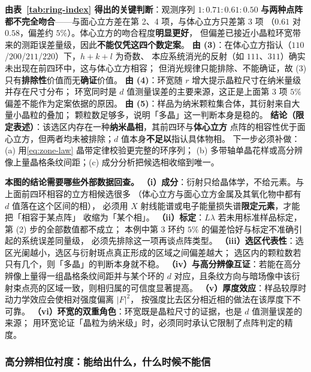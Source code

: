 \begin{infer}
\textbf{由表~\ref{tab:ring-index} 得出的关键判断}：观测序列 $1:0.71:0.61:0.50$
\textbf{与两种点阵都不完全吻合}——与面心立方差在第 2、4 项，与体心立方只差第 3 项
（$0.61$ 对 $0.58$，偏差约 $5\%$）。体心立方的吻合程度\textbf{明显更好}，
但偏差已接近小晶粒环宽带来的测距误差量级，因此\textbf{不能仅凭这四个数定案}。
\textbf{由 (3)}：在体心立方指认（$110$/$200$/$211$/$220$）下，$h+k+l$ 为奇数、
本应系统消光的反射（如 $111$、$311$）确实未出现在前四环中，这与体心立方相容；
但消光规律只能排除、不能确证，故 (3) 只有\textbf{排除性}价值而无\textbf{确证}价值。
\textbf{由 (4)}：环宽随 $r$ 增大提示晶粒尺寸在纳米量级并存在尺寸分布；
环宽同时是 $d$ 值测量误差的主要来源，这正是上面第 3 项 $5\%$ 偏差不能作为定案依据的原因。
\textbf{由 (5)}：样品为纳米颗粒集合体，其衍射来自大量小晶粒的叠加；
颗粒数足够多，说明「多晶」这一判断本身是稳的。
\textbf{结论（限定表述）}：该选区内存在一种\textbf{纳米晶相}，其前四环与\textbf{体心立方}
点阵的相容性优于面心立方，但两者均未被排除；$d$ 值本身\textbf{不足以}指认具体物相。
下一步必须补做：(a) 用\eqref{eq:zone-law} 晶带定律校验更完整的环序列；
(b) 多带轴单晶花样或高分辨像上量晶格条纹间距；(c) 成分分析把候选相收缩到唯一。
\end{infer}

\begin{crosscheck}
\textbf{本图的结论需要哪些外部数据回查。}
\textbf{（i）成分}：衍射只给晶体学，不给元素。与上面前四环相容的立方相候选很多
（体心立方与面心立方金属及其氧化物中都有 $d$ 值落在这个区间的相），
必须用 $X$ 射线能谱或电子能量损失谱\textbf{限定元素}，才能把「相容于某点阵」
收缩为「某个相」。
\textbf{（ii）标定}：$L\lambda$ 若未用标准样品标定，第 (2) 步的全部数值都不成立；
本例中第 3 环约 $5\%$ 的偏差恰好与标定不准确引起的系统误差同量级，
必须先排除这一项再谈点阵类型。
\textbf{（iii）选区代表性}：选区光阑越小，选区与衍射斑点真正形成的区域之间偏差越大；
选区内的颗粒数若只有几个，则「多晶」的判断本身就不稳。
\textbf{（iv）与高分辨像互证}：若能在高分辨像上量得一组晶格条纹间距并与某个环的 $d$
对应，且条纹方向与暗场像中该衍射束点亮的区域一致，则相归属的可信度显著提高。
\textbf{（v）厚度效应}：样品较厚时动力学效应会使相对强度偏离 $|F|^{2}$，
按强度比去区分相近相的做法在该厚度下不可靠。
\textbf{（vi）环宽的双重角色}：环宽既是晶粒尺寸的证据，也是 $d$ 值测量误差的来源；
用环宽论证「晶粒为纳米级」时，必须同时承认它限制了点阵判定的精度。
\end{crosscheck}

\subsubsection{高分辨相位衬度：能给出什么，什么时候不能信}

